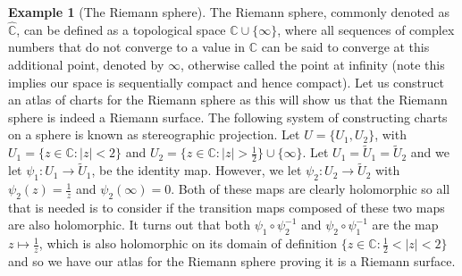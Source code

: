\documentclass[11pt]{report}
\theoremstyle{definition}
\newtheorem{example}[thm]{Example}
\begin{document}
\begin{example}[The Riemann sphere]
  The Riemann sphere, commonly denoted as $\hat{\mathbb{C}}$, can be defined as a topological space $\mathbb{C} \cup \{\infty\}$, where all sequences of complex numbers that do not converge to a value in $\mathbb{C}$ can be said to converge at this additional point, denoted by $\infty$, otherwise called the point at infinity (note this implies our space is sequentially compact and hence compact). Let us construct an atlas of charts for the Riemann sphere as this will show us that the Riemann sphere is indeed a Riemann surface. The following system of constructing charts on a sphere is known as stereographic projection. Let $U=\{U_1,U_2\}$, with $U_1=\{z \in \mathbb{C} : |z| < 2\}$ and $U_2=\{z \in \mathbb{C} : |z| > \frac{1}{2}\}\cup \{\infty\}$. Let $U_1=\tilde{U}_1=\tilde{U}_2$ and we let $\psi_1:U_1 \rightarrow \tilde{U}_1$, be the identity map. However, we let $\psi_2:U_2 \rightarrow \tilde{U}_2$ with $\psi_2(z)=\frac{1}{z}$ and $\psi_2(\infty)=0$. Both of these maps are clearly holomorphic so all that is needed is to consider if the transition maps composed of these two maps are also holomorphic.
  It turns out that both $\psi_1 \circ \psi_2 ^{-1}$ and $\psi_2 \circ \psi_1 ^{-1}$ are the map $z \mapsto \frac{1}{z}$, which is also holomorphic on its domain of definition $\{z\in \mathbb{C} : \frac{1}{2} < |z| < 2\}$ and so we have our atlas for the Riemann sphere proving it is a Riemann surface.
\end{example}
\end{document}
